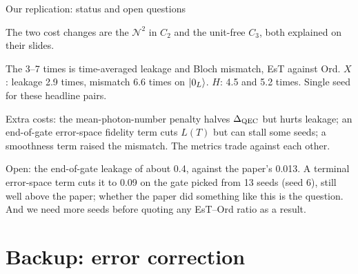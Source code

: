 \begin{frame}{Our replication: status and open questions}
{\begin{ntitem}
      \item The two cost changes are the $\mathcal{N}^2$ in $C_2$ and the unit-free $C_3$,
            both explained on their slides.
      \item The 3--7 times is time-averaged leakage and Bloch mismatch, EsT against Ord. $X$:
            leakage 2.9 times, mismatch 6.6 times on $\left|0_L\right\rangle$. $H$: 4.5 and 5.2 times. Single
            seed for these headline pairs.
      \item Extra costs: the mean-photon-number penalty halves $\Delta_{\mathrm{QEC}}$ but hurts leakage; an
            end-of-gate error-space fidelity term cuts $L(T)$ but can stall some seeds; a
            smoothness term raised the mismatch. The metrics trade against each other.
      \item Open: the end-of-gate leakage of about 0.4, against the paper's 0.013. A terminal
            error-space term cuts it to 0.09 on the gate picked from 13 seeds (seed 6), still well
            above the paper; whether the paper did something like this is the question. And we need more seeds before quoting any EsT--Ord ratio as a result.
    \end{ntitem}}
\end{frame}

\appendix
\renewcommand{\framenumprefix}{B}

\section[Backup: correction]{Backup: error correction}

